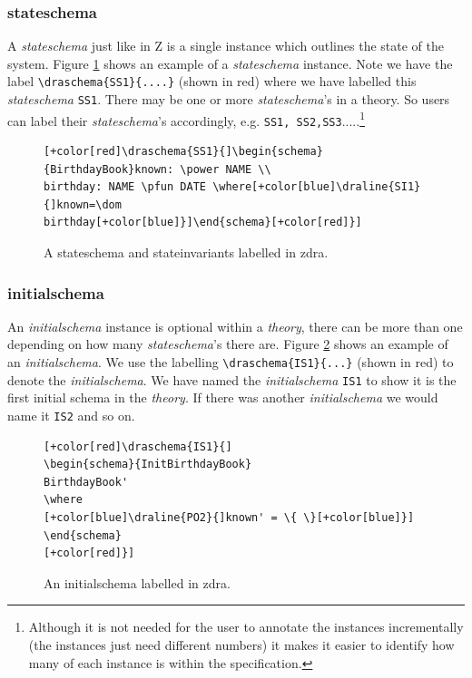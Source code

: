 \subsubsection{stateschema}

A \emph{stateschema} just like in Z is a single instance which outlines the
state of the system. Figure \ref{fig:exampleofss} shows an example of a
\emph{stateschema} instance. Note we have the label \verb|\draschema{SS1}{....}|
(shown in red) where we have labelled this \emph{stateschema} \verb|SS1|. There
may be one or more \emph{stateschema}'s in a theory. So users can label their
\emph{stateschema}'s accordingly, e.g.
\verb|SS1, SS2,SS3|.....\footnote{Although it is not needed for the user to annotate the
instances incrementally (the instances just need different numbers) it makes it
easier to identify how many of each instance is within the specification.}

\begin{figure}[H]
\centering
\begin{footnotesize}
\begin{BVerbatim}[commandchars=+\[\]]
[+color[red]\draschema{SS1}{]\begin{schema}{BirthdayBook}known: \power NAME \\
birthday: NAME \pfun DATE \where[+color[blue]\draline{SI1}{]known=\dom
birthday[+color[blue]}]\end{schema}[+color[red]}]
\end{BVerbatim}
\end{footnotesize}
\caption{\label{fig:exampleofss} A stateschema and stateinvariants labelled in \gls{zdra}.}
\end{figure}

\subsubsection{initialschema}

An \emph{initialschema} instance is optional within a \emph{theory}, there can
be more than one depending on how many \emph{stateschema}'s there are. Figure
\ref{fig:exampleofis} shows an example of an \emph{initialschema}. We use the
labelling \verb|\draschema{IS1}{...}| (shown in red) to denote the
\emph{initialschema}. We have named the \emph{initialschema} \verb|IS1| to show
it is the first initial schema in the \emph{theory}. If there was another
\emph{initialschema} we would name it \verb|IS2| and so on.

\begin{figure}[H]
\centering
\begin{footnotesize}
\begin{BVerbatim}[commandchars=+\[\]]
[+color[red]\draschema{IS1}{]
\begin{schema}{InitBirthdayBook} 
BirthdayBook' 
\where 
[+color[blue]\draline{PO2}{]known' = \{ \}[+color[blue]}]
\end{schema}
[+color[red]}]
\end{BVerbatim}
\caption{\label{fig:exampleofis} An initialschema labelled in \gls{zdra}.}
\end{footnotesize}
\end{figure}

